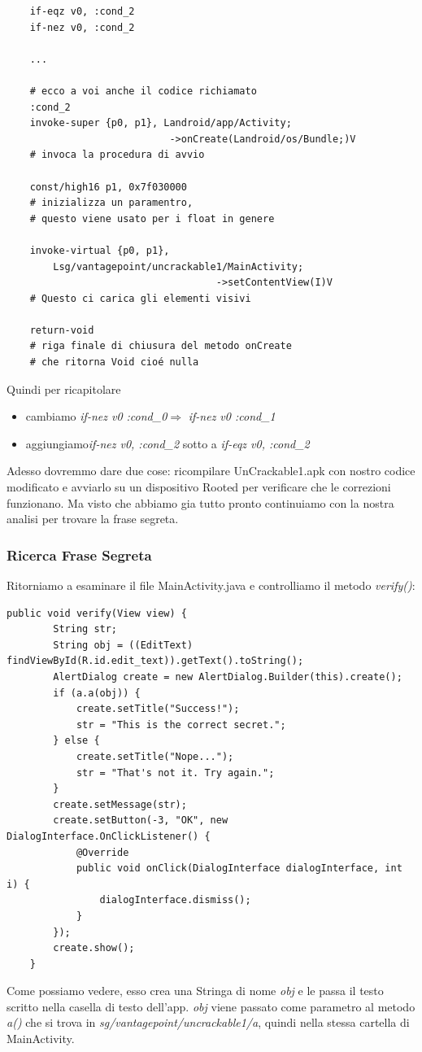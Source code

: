 \documentclass{article}
\begin{document}
\begin{verbatim}
    if-eqz v0, :cond_2
    if-nez v0, :cond_2

    ...

    # ecco a voi anche il codice richiamato
    :cond_2
    invoke-super {p0, p1}, Landroid/app/Activity;
                            ->onCreate(Landroid/os/Bundle;)V
    # invoca la procedura di avvio 

    const/high16 p1, 0x7f030000
    # inizializza un paramentro, 
    # questo viene usato per i float in genere

    invoke-virtual {p0, p1}, 
        Lsg/vantagepoint/uncrackable1/MainActivity;
                                    ->setContentView(I)V
    # Questo ci carica gli elementi visivi
    
    return-void
    # riga finale di chiusura del metodo onCreate 
    # che ritorna Void cioé nulla
\end{verbatim}


Quindi per ricapitolare
\begin{itemize}
    \item cambiamo \emph{if-nez v0 :cond\_0}$\Rightarrow$  \emph{if-nez v0 :cond\_1}
    \item aggiungiamo\emph{if-nez v0, :cond\_2} sotto a \emph{if-eqz v0, :cond\_2}
\end{itemize}

Adesso dovremmo dare due cose: ricompilare UnCrackable1.apk con nostro codice modificato e avviarlo su un dispositivo Rooted
 per verificare che le correzioni funzionano. Ma visto che abbiamo gia tutto pronto continuiamo con la nostra analisi per trovare la 
 frase segreta.

\subsubsection{Ricerca Frase Segreta}
Ritorniamo a esaminare il file MainActivity.java e controlliamo il metodo \textit{verify()}:
\begin{lstlisting}[style=JavaStyle]
    public void verify(View view) {
        String str;
        String obj = ((EditText) findViewById(R.id.edit_text)).getText().toString();
        AlertDialog create = new AlertDialog.Builder(this).create();
        if (a.a(obj)) {
            create.setTitle("Success!");
            str = "This is the correct secret.";
        } else {
            create.setTitle("Nope...");
            str = "That's not it. Try again.";
        }
        create.setMessage(str);
        create.setButton(-3, "OK", new DialogInterface.OnClickListener() { 
            @Override 
            public void onClick(DialogInterface dialogInterface, int i) {
                dialogInterface.dismiss();
            }
        });
        create.show();
    }
\end{lstlisting}
Come possiamo vedere, esso crea una Stringa di nome \textit{obj} e le passa il testo scritto nella casella di testo dell'app. 
\textit{obj} viene
 passato come parametro al metodo
\textit{a()} che si trova in \emph{sg/vantagepoint/uncrackable1/a}, quindi nella stessa cartella di MainActivity.
\end{document}
